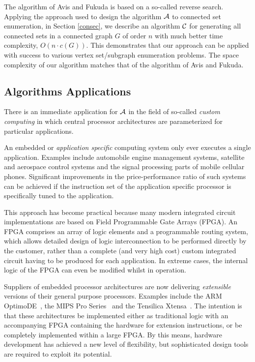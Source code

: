 \documentclass[11pt]{article}
\newcommand{\2}{\vspace{0.2 cm}}
\begin{document}
The algorithm of Avis and Fukuda is based on a so-called reverse
search. Applying the approach used to design the algorithm $\cal A$ to connected
set enumeration, in Section \ref{consec}, we describe an algorithm
$\cal C$ for generating all connected sets in a connected graph $G$
of order $n$ with much better time complexity, $O(n\cdot c(G))$.
This demonstrates that our approach can be applied with success to
various vertex set/subgraph enumeration problems. The space
complexity of our algorithm matches that of the algorithm of Avis
and Fukuda.

\subsection{Algorithms Applications}\label{aasec}

There is an immediate application for $\cal A$ in the field of
so-called {\em custom computing} in which central processor
architectures are parameterized for particular applications.

An embedded or {\em application specific} computing system only ever
executes a single application. Examples include automobile engine
management systems, satellite and aerospace control systems and the
signal processing parts of mobile cellular phones. Significant
improvements in the price-performance ratio of such systems can be
achieved if the instruction set of the application specific
processor is specifically tuned to the application.

This approach has become practical because many modern integrated
circuit implementations are based on Field Programmable Gate Arrays
(FPGA). An FPGA comprises an array of logic elements and a
programmable routing system, which allows detailed design of logic
interconnection to be performed directly by the customer, rather
than a complete (and very high cost) custom integrated circuit
having to be produced for each application. In extreme cases, the
internal logic of the FPGA can even be modified whilst in operation.

Suppliers of embedded processor architectures are now delivering
{\em extensible} versions of their general purpose processors.
Examples include the ARM OptimoDE~\cite{arm}, the MIPS Pro
Series~\cite{mips} and the Tensilica Xtensa~\cite{tens}. The
intention is that these architectures be implemented either as
traditional logic with an accompanying FPGA containing the hardware
for extension instructions, or be completely implemented within a
large FPGA. By this means, hardware development has achieved a new
level of flexibility, but sophisticated design tools are required to
exploit its potential.
\end{document}
